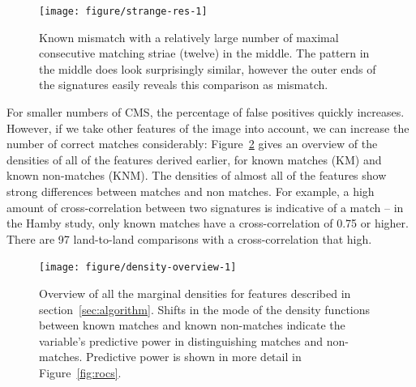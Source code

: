 \documentclass[aoas, preprint]{imsart}\usepackage[]{graphicx}\usepackage[]{color}
\newenvironment{knitrout}{}{} %
\begin{document}
\begin{figure}[hbtp]
  \centering
\begin{knitrout}
\color{fgcolor}
\texttt{[image: figure/strange-res-1]} 

\end{knitrout}
\caption{\label{fig:mismatch}Known mismatch with a relatively large number of maximal consecutive matching striae (twelve) in the middle. The pattern in the middle does look surprisingly similar, however the outer ends of the signatures easily reveals this comparison as mismatch. }
\end{figure}

For smaller numbers of CMS, the percentage of false positives quickly increases. However, if we take other features of the image into account, we can increase the number of correct matches considerably: Figure~\ref{fig:densities} gives an overview of the densities of all of the features derived earlier, for known matches (KM) and known non-matches (KNM). The densities of almost all of the features show strong differences between matches and non matches. For example, a high amount of cross-correlation between two signatures is indicative of a match --  in the Hamby study, only known matches have a cross-correlation of 0.75 or higher. There are 97 land-to-land comparisons with a cross-correlation that high.

\begin{figure}[hbtp]
  \centering
\begin{knitrout}
\color{fgcolor}
\texttt{[image: figure/density-overview-1]} 

\end{knitrout}
\caption{\label{fig:densities}Overview of all the marginal densities for features described in section~\ref{sec:algorithm}. Shifts in the mode of the density functions between known matches and known non-matches indicate the variable's predictive power in distinguishing matches and non-matches. Predictive power is shown in more detail in Figure~\ref{fig:rocs}.}
\end{figure}
\end{document}
